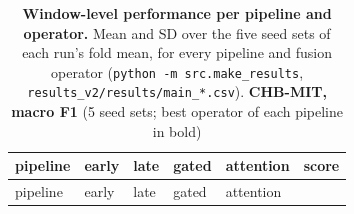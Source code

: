 \documentclass[11pt,a4paper]{article}
\begin{document}
\begin{longtable}[]{@{}
  >{\raggedright\arraybackslash}p{}
  >{\raggedright\arraybackslash}p{}
  >{\raggedright\arraybackslash}p{}
  >{\raggedright\arraybackslash}p{}
  >{\raggedright\arraybackslash}p{}
  >{\raggedright\arraybackslash}p{}@{}}
\caption{\textbf{Window-level performance per pipeline and operator.} Mean and SD over the five seed sets of each run's fold mean, for every pipeline and fusion operator (\protect\texttt{python\ -m\ src.make\_results}, \nolinkurl{results_v2/results/main_*.csv}). \textbf{CHB-MIT, macro F1} (5 seed sets; best operator of each pipeline in bold)}\tabularnewline
\toprule\noalign{}
\begin{minipage}[b]{\linewidth}\raggedright
pipeline
\end{minipage} & \begin{minipage}[b]{\linewidth}\raggedright
early
\end{minipage} & \begin{minipage}[b]{\linewidth}\raggedright
late
\end{minipage} & \begin{minipage}[b]{\linewidth}\raggedright
gated
\end{minipage} & \begin{minipage}[b]{\linewidth}\raggedright
attention
\end{minipage} & \begin{minipage}[b]{\linewidth}\raggedright
score
\end{minipage} \\
\midrule\noalign{}
\endfirsthead
\toprule\noalign{}
\begin{minipage}[b]{\linewidth}\raggedright
pipeline
\end{minipage} & \begin{minipage}[b]{\linewidth}\raggedright
early
\end{minipage} & \begin{minipage}[b]{\linewidth}\raggedright
late
\end{minipage} & \begin{minipage}[b]{\linewidth}\raggedright
gated
\end{minipage} & \begin{minipage}[b]{\linewidth}\raggedright
attention
\end{minipage} & \begin{minipage}[b]{\linewidth}\raggedright

\end{minipage}
\end{longtable}
\end{document}
